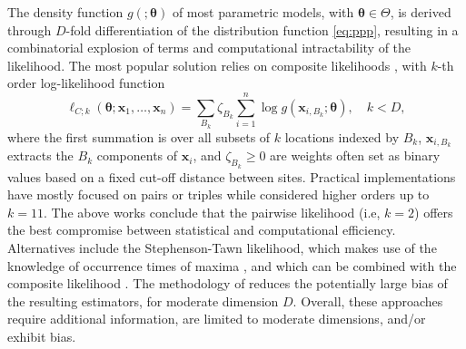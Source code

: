 \documentclass[12pt]{article}
\begin{document}
The density function $g(;\bm \theta)$ of most parametric models, with 
$\bm \theta \in \Theta$, is derived through $D$-fold differentiation of the distribution function \eqref{eq:ppp}, 
resulting
in a combinatorial explosion of terms and computational intractability of the likelihood. The most popular solution relies on composite likelihoods \citep{Padoan.etal:2010, Sang.Genton:2014}, with $k$-th order log-likelihood function 
%
\begin{equation}
\label{eq:composite}
\ell_{C;k}(\bm \theta;\bm x_1,\dots,\bm x_n)
=\sum_{B_k} \zeta_{B_k} \sum_{i=1}^n\log g(\bm x_{i,B_k};\bm \theta), \quad k< D,
\end{equation}
%
where the first summation is over all subsets of $k$ locations indexed by $B_k$, $\bm x_{i,B_k}$ extracts the $B_k$ components of $\bm x_i$, and $\zeta_{B_k} \geq 0$ are weights often set as binary values based on a fixed cut-off distance between sites. 
Practical implementations have mostly focused on pairs or triples \citep{Padoan.etal:2010, Huser.Davison:2013a} while \citet{Castruccio.etal:2016} considered higher orders up to $k=11$. The above works conclude that the pairwise likelihood (i.e, $k=2$) offers the best compromise between statistical and computational efficiency.
Alternatives include the Stephenson-Tawn likelihood, which makes use of the knowledge of occurrence times of maxima 
\citep{Stephenson.Tawn:2005, Wadsworth.Tawn:2014}, and which can be combined with the composite likelihood \citep{Beranger.etal:2021}. The methodology of \citet{Wadsworth:2015} reduces the potentially large bias of the resulting estimators, for moderate dimension $D$. Overall, these approaches require additional information, are limited to moderate dimensions, and/or exhibit bias.
\end{document}
